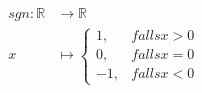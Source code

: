 \begin{align*}
	sgn : \mathbb{R} &\longrightarrow \mathbb{R} \\
	x &\longmapsto
		\begin{cases}
			1, & falls x > 0 \\
			0, & falls x = 0 \\
			-1, & falls x < 0
		\end{cases}
\end{align*}